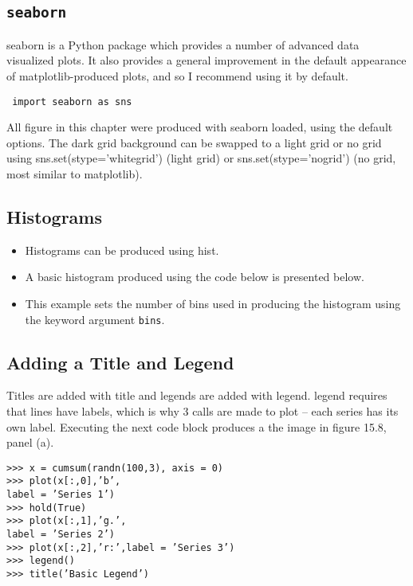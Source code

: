 \documentclass[KSmain.tex]{subfiles}
\begin{document}
\subsection{\texttt{seaborn}}

seaborn is a Python package which provides a number of advanced data visualized plots. It also provides a
general improvement in the default appearance of matplotlib-produced plots, and so I recommend using
it by default.

\begin{framed}
\begin{verbatim}
 import seaborn as sns

\end{verbatim}
\end{framed}
All figure in this chapter were produced with seaborn loaded, using the default options. The dark grid
background can be swapped to a light grid or no grid using sns.set(stype=’whitegrid’) (light grid) or
sns.set(stype=’nogrid’) (no grid, most similar to matplotlib).

\subsection{Histograms}
\begin{itemize}
\item Histograms can be produced using hist. 
\item A basic histogram produced using the code below is presented
below.

\item  This example sets the number of bins used in producing the histogram using the
keyword argument \texttt{bins}.
\end{itemize}
\subsection{Adding a Title and Legend}
Titles are added with title and legends are added with legend. legend requires that lines have labels,
which is why 3 calls are made to plot – each series has its own label. Executing the next code block produces
a the image in figure 15.8, panel (a).

\begin{framed}
\begin{verbatim}
>>> x = cumsum(randn(100,3), axis = 0)
>>> plot(x[:,0],’b’,
label = ’Series 1’)
>>> hold(True)
>>> plot(x[:,1],’g.’,
label = ’Series 2’)
>>> plot(x[:,2],’r:’,label = ’Series 3’)
>>> legend()
>>> title(’Basic Legend’)
\end{verbatim}
\end{framed}
\end{document}
